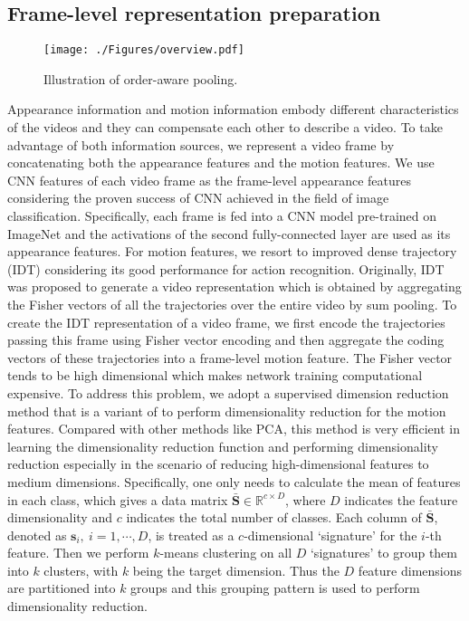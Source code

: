\documentclass[journal]{IEEEtran}
\begin{document}
\subsection{Frame-level representation preparation}
\label{Frame-level representations}
%

\begin{figure*}[ht]
\begin{center}
\texttt{[image: ./Figures/overview.pdf]}
\end{center}
   \caption{Illustration of order-aware pooling.}
\label{fig:network}
\end{figure*}

Appearance information and motion information embody different characteristics of the videos and they can compensate each other to describe a video. To take advantage of both information sources, we represent a video frame by concatenating both the appearance features and the motion features. We use CNN features of each video frame as the frame-level appearance features considering the proven success of CNN achieved in the field of image classification. Specifically, each frame is fed into a CNN model \cite{NIPS2012_4824} pre-trained on ImageNet \cite{imagenet_cvpr09} and the activations of the second fully-connected layer are used as its appearance features. For motion features, we resort to improved dense trajectory (IDT) \cite{Wang2013} considering its good performance for action recognition. Originally, IDT was proposed to generate a video representation which is obtained by aggregating the Fisher vectors of all the trajectories over the entire video by sum pooling. To create the IDT representation of a video frame, we first encode the trajectories passing this frame using Fisher vector encoding and then aggregate the coding vectors of these trajectories into a frame-level motion feature. The Fisher vector tends to be high dimensional which makes network training computational expensive. To address this problem, we adopt a supervised dimension reduction method \cite{DBLP:journals/corr/WangCSLS15} that is a variant of \cite{Liu:2013} to perform dimensionality reduction for the motion features. Compared with other methods like PCA, this method is very efficient in learning the dimensionality reduction function and performing dimensionality reduction especially in the scenario of reducing high-dimensional features to medium dimensions. Specifically, one only needs to calculate the mean of features in each class, which gives a data matrix $\mathbf{\bar S} \in \mathbb{R}^{c\times D}$, where $D$ indicates the feature dimensionality and $c$ indicates the total number of classes. Each column of $\mathbf{\bar S}$, denoted as $\mathbf{s}_i,~i= 1,\cdots,D$, is treated as a $c$-dimensional `signature' for the $i$-th feature. Then we perform $k$-means clustering on all $D$ `signatures' to group them into $k$ clusters, with $k$ being the target dimension. Thus the $D$ feature dimensions are partitioned into $k$ groups and this grouping pattern is used to perform dimensionality reduction.
\end{document}
